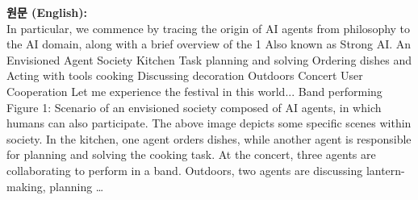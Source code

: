 \documentclass[12pt,a4paper]{article}
\begin{document}
\begin{mdframed}[style=orig]
\noindent\textbf{\small 원문 (English):}\\[2pt]
\small In particular, we commence by tracing the origin of AI agents from philosophy to the AI domain, along with a brief overview of the 1 Also known as Strong AI. An Envisioned Agent Society Kitchen Task planning and solving Ordering dishes and Acting with tools cooking Discussing decoration Outdoors Concert User Cooperation Let me experience the festival in this world... Band performing Figure 1: Scenario of an envisioned society composed of AI agents, in which humans can also participate. The above image depicts some specific scenes within society. In the kitchen, one agent orders dishes, while another agent is responsible for planning and solving the cooking task. At the concert, three agents are collaborating to perform in a band. Outdoors, two agents are discussing lantern-making, planning \ldots
\end{mdframed}
\vspace{0.4em}
\end{document}
